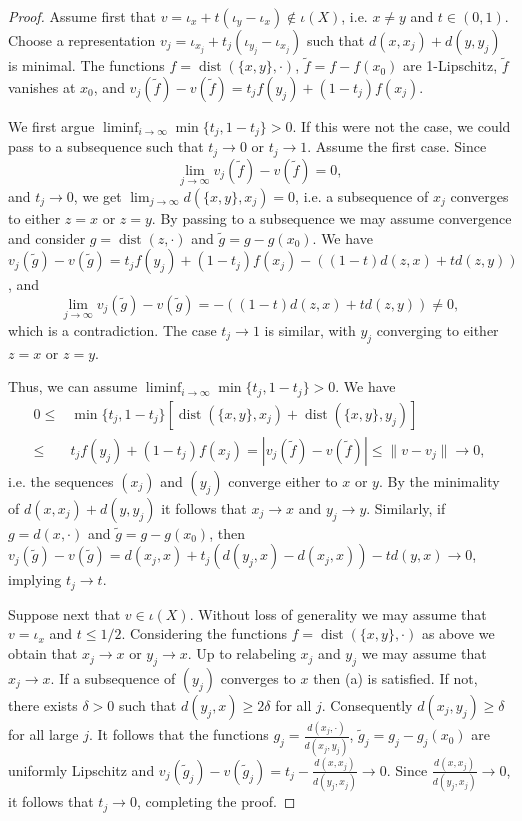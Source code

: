 \documentclass{amsart}
\numberwithin{equation}{section}
\newcommand{\dist}{\operatorname{dist}}
\begin{document}
\begin{proof}
Assume first that $v=\iota_x+t(\iota_y-\iota_x)\notin \iota(X)$, i.e. $x\ne y$ and $t\in (0,1)$. Choose a representation $v_j=\iota_{x_j}+t_j(\iota_{y_j}-\iota_{x_j})$ such that $d(x,x_j)+d(y,y_j)$ is minimal. The functions $f=\dist(\{x,y\},\cdot)$, $\tilde f=f-f(x_0)$ are 1-Lipschitz, $\tilde f$ vanishes at $x_0$, and
$v_j(\tilde f)-v(\tilde f)=t_jf(y_j)+(1-t_j)f(x_j)$. 

We first argue $\liminf_{i\to \infty} \min\{t_j,1-t_j\} >0$. If this were not the case, we could pass to a subsequence such that $t_j\to 0$ or $t_j\to 1$. Assume the first case. Since 
\[
\lim_{j\to \infty} v_j(\tilde f)-v(\tilde f)=0,
\]
and $t_j\to 0$, we get $\lim_{j\to \infty} d(\{x,y\},x_j)=0$, i.e. a subsequence of $x_j$ converges to either $z=x$ or $z=y$. By passing to a subsequence we may assume convergence and consider $g=\dist(z,\cdot)$ and $\tilde g=g-g(x_0)$. We have
$v_j(\tilde g)-v(\tilde g)=t_jf(y_j)+(1-t_j)f(x_j)-((1-t)d(z,x)+td(z,y))$, and
\[
\lim_{j\to \infty} v_j(\tilde g)-v(\tilde g) = -((1-t)d(z,x)+td(z,y))\neq 0,
\]
which is a contradiction. The case $t_j\to 1$ is similar, with $y_j$ converging to either $z=x$ or $z=y$.

Thus, we can assume $\liminf_{i\to \infty} \min\{t_j,1-t_j\} >0$.  We have
    \begin{align*}
    0\le &\min\{t_j,1-t_j\}[\dist(\{x,y\},x_j)+\dist(\{x,y\},y_j)]\\ 
    \le &t_jf(y_j)+(1-t_j)f(x_j) = |v_j(\tilde f)-v(\tilde f)|\le \|v-v_j\|\to 0,
    \end{align*}
    i.e. the sequences $(x_j)$ and $(y_j)$ converge either to $x$ or $y$. By the minimality of $d(x,x_j)+d(y,y_j)$ it follows that $x_j\to x$ and $y_j\to y$. Similarly, if $g=d(x,\cdot)$ and $\tilde g=g-g(x_0)$, then $v_j(\tilde g)-v(\tilde g)=d(x_j,x)+t_j(d(y_j,x)-d(x_j,x))-td(y,x)\to 0$, implying $t_j\to t$.

    Suppose next that $v\in \iota(X)$. Without loss of generality we may assume that $v=\iota_x$ and $t\le 1/2$.  Considering the functions $f=\dist(\{x,y\},\cdot)$ as above we obtain that $x_j\to x$ or $y_j\to x$. Up to relabeling $x_j$ and $y_j$ we may assume that $x_j\to x$. If a subsequence of  $(y_j)$ converges to $x$ then (a) is satisfied. If not, there exists $\delta>0$ such that $d(y_j,x)\ge 2\delta $ for all $j$. Consequently $d(x_j,y_j)\ge \delta$ for all large $j$. It follows that the functions $g_j=\frac{d(x_j,\cdot)}{d(x_j,y_j)}$, $\tilde g_j=g_j-g_j(x_0)$ are uniformly Lipschitz and $v_j(\tilde g_j)-v(\tilde g_j)=t_j-\frac{d(x,x_j)}{d(y_j,x_j)}\to 0$. Since $\frac{d(x,x_j)}{d(y_j,x_j)}\to 0$, it follows that $t_j\to 0$, completing the proof.
\end{proof}
\end{document}

